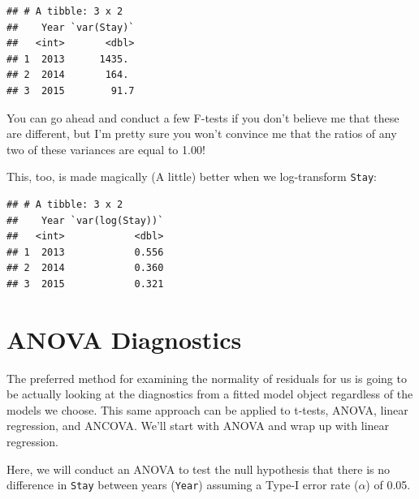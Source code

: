\documentclass[
]{book}
\newenvironment{Shaded}{\begin{snugshade}}{\end{snugshade}}
\newcommand{\KeywordTok}[1]{\textcolor[rgb]{0.13,0.29,0.53}{\textbf{#1}}}
\newcommand{\NormalTok}[1]{#1}
\newcommand{\OperatorTok}[1]{\textcolor[rgb]{0.81,0.36,0.00}{\textbf{#1}}}
\newcommand{\StringTok}[1]{\textcolor[rgb]{0.31,0.60,0.02}{#1}}
\begin{document}
\begin{Shaded}
\end{Shaded}

\begin{verbatim}
## # A tibble: 3 x 2
##    Year `var(Stay)`
##   <int>       <dbl>
## 1  2013      1435. 
## 2  2014       164. 
## 3  2015        91.7
\end{verbatim}

You can go ahead and conduct a few F-tests if you don't believe me that these are different, but I'm pretty sure you won't convince me that the ratios of any two of these variances are equal to 1.00!

This, too, is made magically (A little) better when we log-transform \texttt{Stay}:

\begin{Shaded}
\end{Shaded}

\begin{verbatim}
## # A tibble: 3 x 2
##    Year `var(log(Stay))`
##   <int>            <dbl>
## 1  2013            0.556
## 2  2014            0.360
## 3  2015            0.321
\end{verbatim}

\hypertarget{anova-diagnostics}{%
\section{ANOVA Diagnostics}\label{anova-diagnostics}}

The preferred method for examining the normality of residuals for us is going to be actually looking at the diagnostics from a fitted model object regardless of the models we choose. This same approach can be applied to t-tests, ANOVA, linear regression, and ANCOVA. We'll start with ANOVA and wrap up with linear regression.

Here, we will conduct an ANOVA to test the null hypothesis that there is no difference in \texttt{Stay} between years (\texttt{Year}) assuming a Type-I error rate (\(\alpha\)) of 0.05.
\end{document}
